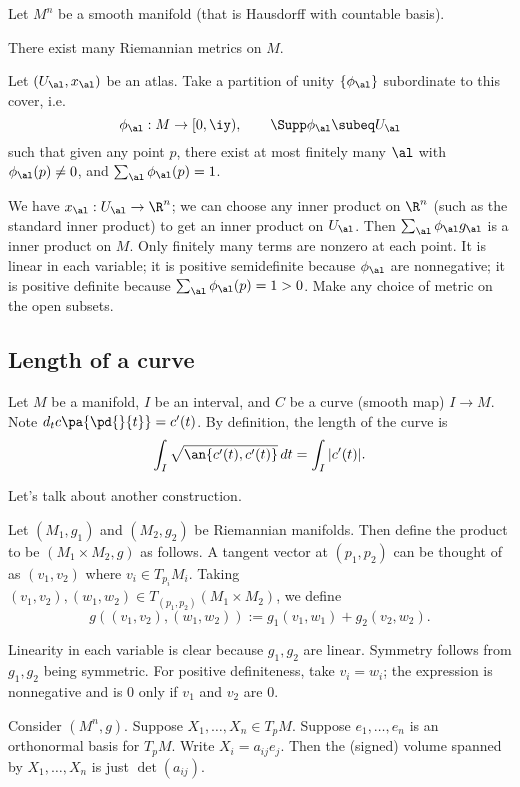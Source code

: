 Let $M^n$ be a smooth manifold (that is Hausdorff with countable basis).
\begin{clm}
There exist many Riemannian metrics on $M$.
\end{clm}
Let $(U_{\al},x_{\al})$ be an atlas. Take a partition of unity $\{\phi_{\al}\}$ subordinate to this cover, i.e.
\[
\phi_{\al}:M\to [0,\iy),\qquad \Supp \phi_{\al}\subeq U_{\al}
\]
such that given any point $p$, there exist at most finitely many $\al$ with $\phi_{\al}(p)\ne 0$, and $\sum_{\al}\phi_{\al}(p)=1$.

We have $x_{\al}:U_{\al}\to \R^n$; we can choose any inner product on $\R^n$ (such as the standard inner product) to get an inner product on $U_{\al}$. Then $\sum_{\al} \phi_{\al}g_{\al}$ is a inner product on $M$. Only finitely many terms are nonzero at each point. It is linear in each variable; it is positive semidefinite because $\phi_{\al}$ are nonnegative; it is positive definite because $\sum_{\al}\phi_{\al}(p)=1>0$.  Make any choice of metric on the open subsets.

\subsection{Length of a curve}
\begin{df}
Let $M$ be a manifold, $I$ be an interval, and $C$ be a curve (smooth map) $I\to M$. Note $d_tc\pa{\pd{}{t}}=c'(t)$. By definition, the length of the curve is
\[
\int_I \sqrt{\an{c'(t),c'(t)}}\,dt=\int_I|c'(t)|.
\]
\end{df}
Let's talk about another construction. 
\begin{df}
Let $(M_1,g_1)$ and $(M_2,g_2)$ be Riemannian manifolds. Then  define the product to be $(M_1\times M_2,g)$ as follows. %
A tangent vector at $(p_1,p_2)$ can be thought of as $(v_1,v_2)$ where $v_i\in T_{p_i}M_i$. Taking $(v_1,v_2),(w_1,w_2)\in T_{(p_1,p_2)}(M_1\times M_2)$, we define
\[
g((v_1,v_2),(w_1,w_2)):=g_1(v_1,w_1)+g_2(v_2,w_2).
\]
\end{df}
Linearity in each variable is clear because $g_1,g_2$ are linear. Symmetry follows from $g_1,g_2$ being symmetric. For positive definiteness, take $v_i=w_i$; the expression is nonnegative and is 0 only if $v_1$ and $v_2$ are 0.

Consider $(M^n,g)$. Suppose $X_1,\ldots, X_n\in T_pM$. Suppose $e_1,\ldots, e_n$ is an orthonormal basis for $T_pM$. Write $X_i=a_{ij}e_j$. Then the (signed) volume spanned by $X_1,\ldots, X_n$ is just $\det(a_{ij})$.

